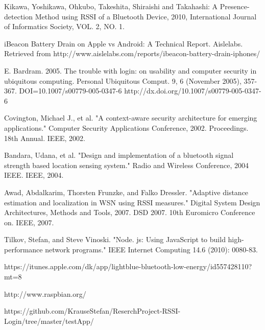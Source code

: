 
%
%
%
\begin{thebibliography}{1}

 Kikawa, Yoshikawa, Ohkubo, Takeshita, Shiraishi and Takahashi:  
 A Presence-detection Method using RSSI of a Bluetooth Device, 2010, International Journal of Informatics Society, VOL. 2, NO. 1. 


iBeacon Battery Drain on Apple vs Android: A Technical Report. Aislelabs. Retrieved from http://www.aislelabs.com/reports/ibeacon-battery-drain-iphones/

E. Bardram. 2005. The trouble with login: on usability and computer security in ubiquitous computing. Personal Ubiquitous Comput. 9, 6 (November 2005), 357-367. DOI=10.1007/s00779-005-0347-6 http://dx.doi.org/10.1007/s00779-005-0347-6

Covington, Michael J., et al. "A context-aware security architecture for emerging applications." Computer Security Applications Conference, 2002. Proceedings. 18th Annual. IEEE, 2002.

Bandara, Udana, et al. "Design and implementation of a bluetooth signal strength based location sensing system." Radio and Wireless Conference, 2004 IEEE. IEEE, 2004.

Awad, Abdalkarim, Thorsten Frunzke, and Falko Dressler. "Adaptive distance estimation and localization in WSN using RSSI measures." Digital System Design Architectures, Methods and Tools, 2007. DSD 2007. 10th Euromicro Conference on. IEEE, 2007.

Tilkov, Stefan, and Steve Vinoski. "Node. js: Using JavaScript to build high-performance network programs." IEEE Internet Computing 14.6 (2010): 0080-83.

https://itunes.apple.com/dk/app/lightblue-bluetooth-low-energy/id557428110?mt=8

http://www.raspbian.org/

https://github.com/KrauseStefan/ReserchProject-RSSI-Login/tree/master/testApp/


\end{thebibliography}
